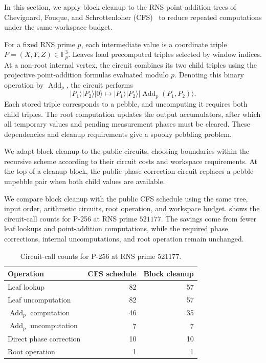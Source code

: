 \documentclass[11pt]{article}
\theoremstyle{definition}
\theoremstyle{remark}
\newcommand{\ket}[1]{\lvert#1\rangle}
\begin{document}
In this section, we apply block cleanup to the RNS point-addition
trees of Chevignard, Fouque, and Schrottenloher
(CFS)~\cite{CFS2026} to reduce repeated computations under
the same workspace budget.

For a fixed RNS prime $p$, each intermediate value is a coordinate
triple $P=(X,Y,Z)\in\mathbb F_p^3$. Leaves load precomputed triples
selected by window indices. At a non-root internal vertex,
the circuit combines its two child triples using the projective
point-addition formulas evaluated modulo $p$. Denoting this binary
operation by $\operatorname{Add}_p$, the circuit performs
\begin{equation}
\ket{P_1}\ket{P_2}\ket{0}
\longmapsto
\ket{P_1}\ket{P_2}\ket{\operatorname{Add}_p(P_1,P_2)}.
\label{eq:cfs-add}
\end{equation}
Each stored triple corresponds to a pebble, and uncomputing it
requires both child triples. The root computation updates the
output accumulators, after which all temporary values and pending
measurement phases must be cleared. These dependencies and cleanup
requirements give a spooky pebbling problem.

We adapt block cleanup to the public circuits, choosing boundaries
within the recursive scheme according to their circuit costs
and workspace requirements. At the top of a cleanup block,
the public phase-correction circuit replaces a pebble--unpebble
pair when both child values are available.

We compare block cleanup with the public CFS schedule using the
same tree, input order, arithmetic circuits, root operation,
and workspace budget.
 shows the circuit-call counts for P-256
at RNS prime $521177$. The savings come from fewer leaf lookups
and point-addition computations, while the required phase
corrections, internal uncomputations, and root operation
remain unchanged.

\begin{table}[H]
\centering
\small
\begin{tabular}{@{}lrr@{}}
\toprule
Operation & CFS schedule & Block cleanup \\
\midrule
Leaf lookup                         & 82 & 57 \\
Leaf uncomputation                  & 82 & 57 \\
$\operatorname{Add}_p$ computation   & 46 & 35 \\
$\operatorname{Add}_p$ uncomputation &  7 &  7 \\
Direct phase correction             & 10 & 10 \\
Root operation                     &  1 &  1 \\
\bottomrule
\end{tabular}
\caption{Circuit-call counts for P-256 at RNS prime $521177$.}
\label{tab:cfs-calls}
\end{table}
\end{document}
